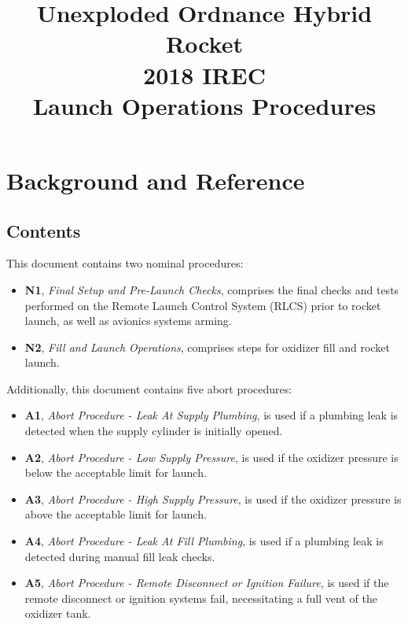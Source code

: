 

\title{
\Huge Unexploded Ordnance Hybrid Rocket\\
2018 IREC\\
\vspace{1cm}
\Large Launch Operations Procedures}





\section{Background and Reference}

\subsection{Contents}
This document contains two nominal procedures:
\begin{itemize}
    \item \textbf{N1}, \textit{Final Setup and Pre-Launch Checks}, comprises the final checks and tests performed on the Remote Launch Control System (RLCS) prior to rocket launch, as well as avionics systems arming.
    \item \textbf{N2}, \textit{Fill and Launch Operations}, comprises steps for oxidizer fill and rocket launch.
\end{itemize}
Additionally, this document contains five abort procedures:
\begin{itemize}
    \item \textbf{A1}, \textit{Abort Procedure - Leak At Supply Plumbing}, is used if a plumbing leak is detected when the supply cylinder is initially opened.
    \item \textbf{A2}, \textit{Abort Procedure - Low Supply Pressure}, is used if the oxidizer pressure is below the acceptable limit for launch.
    \item \textbf{A3}, \textit{Abort Procedure - High Supply Pressure}, is used if the oxidizer pressure is above the acceptable limit for launch.
    \item \textbf{A4}, \textit{Abort Procedure - Leak At Fill Plumbing}, is used if a plumbing leak is detected during manual fill leak checks.
    \item \textbf{A5}, \textit{Abort Procedure - Remote Disconnect or Ignition Failure}, is used if the remote disconnect or ignition systems fail, necessitating a full vent of the oxidizer tank.
\end{itemize}

